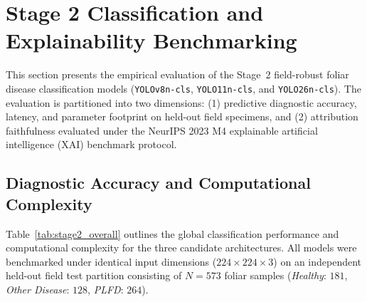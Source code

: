 
\section{Stage 2 Classification and Explainability Benchmarking}
\label{sec:stage2_results}

This section presents the empirical evaluation of the Stage~2 field-robust foliar disease classification models (\texttt{YOLOv8n-cls}, \texttt{YOLO11n-cls}, and \texttt{YOLO26n-cls}). The evaluation is partitioned into two dimensions: (1) predictive diagnostic accuracy, latency, and parameter footprint on held-out field specimens, and (2) attribution faithfulness evaluated under the NeurIPS 2023 M4 explainable artificial intelligence (XAI) benchmark protocol.

\subsection{Diagnostic Accuracy and Computational Complexity}
\label{subsec:accuracy_complexity}

Table~\ref{tab:stage2_overall} outlines the global classification performance and computational complexity for the three candidate architectures. All models were benchmarked under identical input dimensions ($224 \times 224 \times 3$) on an independent held-out field test partition consisting of $N = 573$ foliar samples (\textit{Healthy}: $181$, \textit{Other Disease}: $128$, \textit{PLFD}: $264$).

\begin{table}[t]
\centering
\caption{Overall Performance, Model Size, and Inference Latency of Stage~2 Field-Robust Classifiers on Held-Out Field Data ($N=573$).}
\label{tab:stage2_overall}
\end{table}

